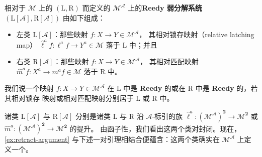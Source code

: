 \begin{definition}\label{def:reedy-weak-factorization-system}
相对于 $\mathcal{M}$ 上的\trWeakFactorizationSystem{} $(\mathrm{L},\mathrm{R})$
而定义的 $\mathcal{M}^{\mathcal{A}}$ 上的\textbf{Reedy 弱分解系统}
$(\mathrm{L}[\mathcal{A}],\mathrm{R}[\mathcal{A}])$ 由如下组成：
\begin{itemize}
\item 左类 $\mathrm{L}[\mathcal{A}]$：那些映射 $f\colon X\to Y\in\mathcal{M}^{\mathcal{A}}$，
  其相对锁存映射（relative latching map）
  $\widehat{\ell}^{a}f\colon\ell^{a}f\to Y^{a}\in\mathcal{M}$ 落于
  $\mathrm{L}$ 中；并且
\item 右类 $\mathrm{R}[\mathcal{A}]$：那些映射 $f\colon X\to Y\in\mathcal{M}^{\mathcal{A}}$，
  其相对匹配映射 $\widehat{m}^{a}f\colon X^{a}\to m^{a}f\in\mathcal{M}$ 落于 $\mathrm{R}$ 中。
\end{itemize}
我们说一个映射 $f\colon X\to Y\in\mathcal{M}^{\mathcal{A}}$ 在 $\mathrm{L}$
中是 \textbf{Reedy} 的或在 $\mathrm{R}$ 中是 \textbf{Reedy} 的，若其相对锁存
映射或相对匹配映射分别居于 $\mathrm{L}$ 或 $\mathrm{R}$ 中。
\end{definition}

诸类 $\mathrm{L}[\mathcal{A}]$ 与 $\mathrm{R}[\mathcal{A}]$ 分别是诸类
$\mathrm{L}$ 与 $\mathrm{R}$ 沿 $\mathcal{A}$-标引的\trFunctor{}族
$\widehat{\ell}^{a}\colon(\mathcal{M}^{\mathcal{A}})^{\mathbf{2}}\to\mathcal{M}^{\mathbf{2}}$
或 $\widehat{m}^{a}\colon(\mathcal{M}^{\mathcal{A}})^{\mathbf{2}}\to\mathcal{M}^{\mathbf{2}}$ 的提升。
由函子性，我们看出这两个类对\trRetract{}封闭。现在，\cref{ex:retract-argument}
与下述一对引理相结合便蕴含：这两个类确实在\trCategory{}
$\mathcal{M}^{\mathcal{A}}$ 上定义一个\trWeakFactorizationSystem。

